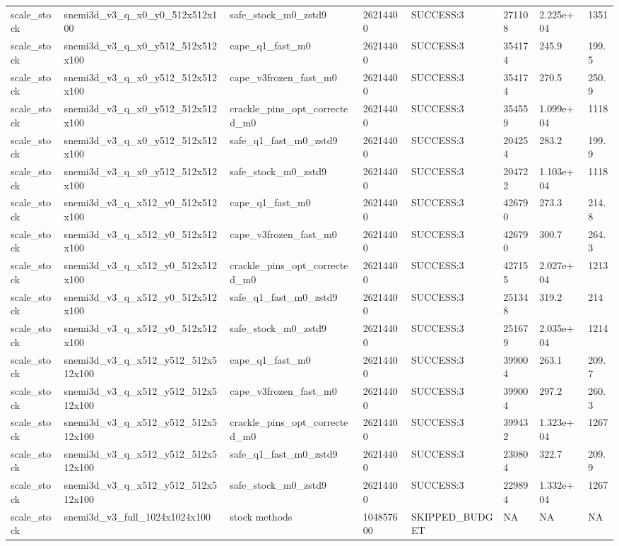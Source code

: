 \begin{table}[t]
\begin{tabular}{llllllll}
scale\_stock & snemi3d\_v3\_q\_x0\_y0\_512x512x100 & safe\_stock\_m0\_zstd9 & 26214400 & SUCCESS:3 & 271108 & 2.225e+04 & 1351 \\
scale\_stock & snemi3d\_v3\_q\_x0\_y512\_512x512x100 & cape\_q1\_fast\_m0 & 26214400 & SUCCESS:3 & 354174 & 245.9 & 199.5 \\
scale\_stock & snemi3d\_v3\_q\_x0\_y512\_512x512x100 & cape\_v3frozen\_fast\_m0 & 26214400 & SUCCESS:3 & 354174 & 270.5 & 250.9 \\
scale\_stock & snemi3d\_v3\_q\_x0\_y512\_512x512x100 & crackle\_pins\_opt\_corrected\_m0 & 26214400 & SUCCESS:3 & 354559 & 1.099e+04 & 1118 \\
scale\_stock & snemi3d\_v3\_q\_x0\_y512\_512x512x100 & safe\_q1\_fast\_m0\_zstd9 & 26214400 & SUCCESS:3 & 204254 & 283.2 & 199.9 \\
scale\_stock & snemi3d\_v3\_q\_x0\_y512\_512x512x100 & safe\_stock\_m0\_zstd9 & 26214400 & SUCCESS:3 & 204722 & 1.103e+04 & 1118 \\
scale\_stock & snemi3d\_v3\_q\_x512\_y0\_512x512x100 & cape\_q1\_fast\_m0 & 26214400 & SUCCESS:3 & 426790 & 273.3 & 214.8 \\
scale\_stock & snemi3d\_v3\_q\_x512\_y0\_512x512x100 & cape\_v3frozen\_fast\_m0 & 26214400 & SUCCESS:3 & 426790 & 300.7 & 264.3 \\
scale\_stock & snemi3d\_v3\_q\_x512\_y0\_512x512x100 & crackle\_pins\_opt\_corrected\_m0 & 26214400 & SUCCESS:3 & 427155 & 2.027e+04 & 1213 \\
scale\_stock & snemi3d\_v3\_q\_x512\_y0\_512x512x100 & safe\_q1\_fast\_m0\_zstd9 & 26214400 & SUCCESS:3 & 251348 & 319.2 & 214 \\
scale\_stock & snemi3d\_v3\_q\_x512\_y0\_512x512x100 & safe\_stock\_m0\_zstd9 & 26214400 & SUCCESS:3 & 251679 & 2.035e+04 & 1214 \\
scale\_stock & snemi3d\_v3\_q\_x512\_y512\_512x512x100 & cape\_q1\_fast\_m0 & 26214400 & SUCCESS:3 & 399004 & 263.1 & 209.7 \\
scale\_stock & snemi3d\_v3\_q\_x512\_y512\_512x512x100 & cape\_v3frozen\_fast\_m0 & 26214400 & SUCCESS:3 & 399004 & 297.2 & 260.3 \\
scale\_stock & snemi3d\_v3\_q\_x512\_y512\_512x512x100 & crackle\_pins\_opt\_corrected\_m0 & 26214400 & SUCCESS:3 & 399432 & 1.323e+04 & 1267 \\
scale\_stock & snemi3d\_v3\_q\_x512\_y512\_512x512x100 & safe\_q1\_fast\_m0\_zstd9 & 26214400 & SUCCESS:3 & 230804 & 322.7 & 209.9 \\
scale\_stock & snemi3d\_v3\_q\_x512\_y512\_512x512x100 & safe\_stock\_m0\_zstd9 & 26214400 & SUCCESS:3 & 229894 & 1.332e+04 & 1267 \\
scale\_stock & snemi3d\_v3\_full\_1024x1024x100 & stock methods & 104857600 & SKIPPED\_BUDGET & NA & NA & NA \\
\hline
\end{tabular}
\end{table}
